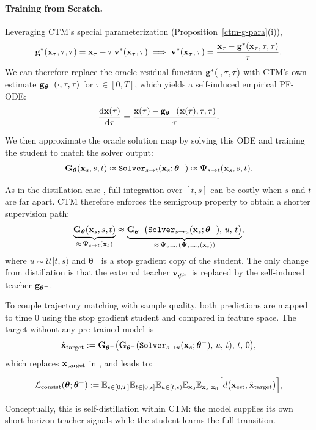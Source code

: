 \paragraph{Training from Scratch.}
Leveraging CTM's special parameterization (Proposition~\ref{ctm-g-para}(i)), 
\[
{\mathbf{g}}^*({\mathbf{x}}_\tau, \tau, \tau)
= {\mathbf{x}}_\tau - \tau\,{\mathbf{v}}^*({\mathbf{x}}_\tau,\tau)
 \implies 
{\mathbf{v}}^*({\mathbf{x}}_\tau,\tau)
= \frac{{\mathbf{x}}_\tau - {\mathbf{g}}^*({\mathbf{x}}_\tau, \tau, \tau)}{\tau}.
\]
We can therefore replace the oracle residual function
${\mathbf{g}}^*(\cdot,\tau,\tau)$ with CTM's own estimate
${\mathbf{g}}_{\bm{\theta}^-}(\cdot,\tau,\tau)$ for $\tau \in [0,T]$,
which yields a self-induced empirical PF-ODE:
\begin{align}\label{eq:emp-pf-ode-ctm}
\frac{\mathop{}\!\mathrm{d} {\mathbf{x}}(\tau)}{\mathop{}\!\mathrm{d} \tau}
= \frac{{\mathbf{x}}(\tau) - {\mathbf{g}}_{\bm{\theta}^-} \left({\mathbf{x}}(\tau),\tau,\tau\right)}{\tau}.
\end{align}

We then approximate the oracle solution map by solving this ODE and training the
student to match the solver output:
\[
\mathbf{G}_{\bm{\theta}}({\mathbf{x}}_s, s, t)
\approx \mathtt{Solver}_{s\to t}({\mathbf{x}}_s;\bm{\theta}^-)
\approx {\bm{\Psi}}_{s\to t}({\mathbf{x}}_s, s, t).
\]

As in the distillation case , full integration over $[t,s]$ can be
costly when $s$ and $t$ are far apart. CTM therefore enforces the semigroup
property to obtain a shorter supervision path:
\[
\underbrace{\mathbf{G}_{\bm{\theta}}({\mathbf{x}}_s, s, t)}_{\approx\, {\bm{\Psi}}_{s\to t}({\mathbf{x}}_s)}
 \approx 
\underbrace{\mathbf{G}_{\bm{\theta}^-} \big(\mathtt{Solver}_{s\to u}({\mathbf{x}}_s;\bm{\theta}^-),\, u,\, t\big)}_{\approx\, {\bm{\Psi}}_{u\to t}({\bm{\Psi}}_{s\to u}({\mathbf{x}}_s))},
\]
where $u \sim \mathcal{U}[t,s)$ and $\bm{\theta}^-$ is a stop gradient copy of
the student. The only change from distillation is that the external teacher
${\mathbf{v}}_{\bm{\phi}^\times}$ is replaced by the self-induced teacher
${\mathbf{g}}_{\bm{\theta}^-}$.

To couple trajectory matching with sample quality, both predictions are mapped
to time $0$ using the stop gradient student and compared in feature space. The
target without any pre-trained model is
\[
\hat{{\mathbf{x}}}_{\mathrm{target}}
:= \mathbf{G}_{\bm{\theta}^-} \big(
\mathbf{G}_{\bm{\theta}^-}(\mathtt{Solver}_{s\to u}({\mathbf{x}}_s;\bm{\theta}^-),\, u,\, t),\, t,\, 0\big),
\]
which replaces ${\mathbf{x}}_{\mathrm{target}}$ in , and leads to:
\begin{mdframed}
    \begin{align}\label{eq:ctm-consist-scratch}
\begin{aligned}
\mathcal{L}_{\mathrm{consist}}(\bm{\theta}; {\bm{\theta}}^-)
:=
\mathbb{E}_{s \in [0,T]}\mathbb{E}_{t \in [0,s]}\mathbb{E}_{u \in [t,s)}
\mathbb{E}_{{\mathbf{x}}_0}\mathbb{E}_{{\mathbf{x}}_s |{\mathbf{x}}_0}
\Big[ d\big({\mathbf{x}}_{\mathrm{est}}, \hat{{\mathbf{x}}}_{\mathrm{target}}\big) \Big],
\end{aligned}
\end{align}
\end{mdframed}
Conceptually, this is
self-distillation within CTM: the model supplies its own short horizon teacher
signals while the student learns the full transition.



